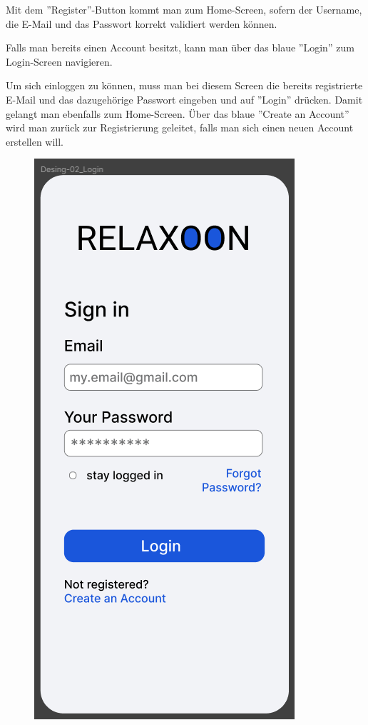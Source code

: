 Mit dem ''Register''-Button kommt man zum Home-Screen, sofern der Username, die E-Mail und das Passwort korrekt validiert
werden können.

Falls man bereits einen Account besitzt, kann man über das blaue ''Login'' zum Login-Screen navigieren.

\newpage

Um sich einloggen zu können, muss man bei diesem Screen die bereits registrierte E-Mail und das dazugehörige Passwort
eingeben und auf ''Login'' drücken. Damit gelangt man ebenfalls zum Home-Screen. Über das blaue ''Create an Account''
wird man zurück zur Registrierung geleitet, falls man sich einen neuen Account erstellen will.

\begin{figure}[H]
    \begin{minipage}{0.5\textwidth}
        \centering
        \includegraphics[height=2\textwidth]{./pics/pLogin.png}

\end{minipage}
\end{figure}
